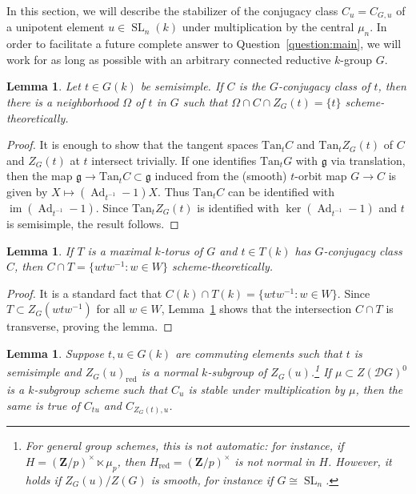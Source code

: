 \documentclass[11pt,reqno]{amsart}
\newtheorem{lemma}[theorem]{Lemma}
\theoremstyle{definition}
\renewcommand{\rm}{\mathrm}
\newcommand{\bZ}{{\mathbf Z}}
\newcommand{\sD}{{\mathscr D}}
\newcommand{\fg}{\mathfrak{g}}
\DeclareMathOperator{\Ad}{Ad}
\DeclareMathOperator{\im}{im}
\DeclareMathOperator{\SL}{SL}
\begin{document}
In this section, we will describe the stabilizer of the conjugacy class $C_u = C_{G, u}$ of a unipotent element $u \in \SL_n(k)$ under multiplication by the central $\mu_n$. In order to facilitate a future complete answer to Question~\ref{question:main}, we will work for as long as possible with an arbitrary connected reductive $k$-group $G$.

\begin{lemma}\label{lemma:transverse-orbit-centralizer}
    Let $t \in G(k)$ be semisimple. If $C$ is the $G$-conjugacy class of $t$, then there is a neighborhood $\Omega$ of $t$ in $G$ such that $\Omega \cap C \cap Z_G(t) = \{t\}$ scheme-theoretically.
\end{lemma}

\begin{proof}
    It is enough to show that the tangent spaces $\rm{Tan}_t C$ and $\rm{Tan}_t Z_G(t)$ of $C$ and $Z_G(t)$ at $t$ intersect trivially. If one identifies $\rm{Tan}_t G$ with $\fg$ via translation, then the map $\fg \to \rm{Tan}_t C \subset \fg$ induced from the (smooth) $t$-orbit map $G \to C$ is given by $X \mapsto (\Ad_{t^{-1}} - 1)X$. Thus $\rm{Tan}_t C$ can be identified with $\im(\Ad_{t^{-1}} - 1)$. Since $\rm{Tan}_t Z_G(t)$ is identified with $\ker(\Ad_{t^{-1}} - 1)$ and $t$ is semisimple, the result follows.
\end{proof}

\begin{lemma}\label{lemma:semisimple-conjugacy-class-cap-T}
    If $T$ is a maximal $k$-torus of $G$ and $t \in T(k)$ has $G$-conjugacy class $C$, then $C \cap T = \{wtw^{-1}\colon w \in W\}$ scheme-theoretically.
\end{lemma}

\begin{proof}
    It is a standard fact that $C(k) \cap T(k) = \{wtw^{-1}\colon w \in W\}$. Since $T \subset Z_G(wtw^{-1})$ for all $w \in W$, Lemma~\ref{lemma:transverse-orbit-centralizer} shows that the intersection $C \cap T$ is transverse, proving the lemma.
\end{proof}

\begin{lemma}\label{lemma:stability-passes-to-jordan}
    Suppose $t, u \in G(k)$ are commuting elements such that $t$ is semisimple and $Z_G(u)_{\rm{red}}$ is a normal $k$-subgroup of $Z_G(u)$.\footnote{For general group schemes, this is not automatic: for instance, if $H = (\bZ/p)^\times \ltimes \mu_p$, then $H_{\rm{red}} = (\bZ/p)^\times$ is not normal in $H$. However, it holds if $Z_G(u)/Z(G)$ is smooth, for instance if $G \cong \SL_n$.}
    If $\mu \subset Z(\sD G)^0$ is a $k$-subgroup scheme such that $C_u$ is stable under multiplication by $\mu$, then the same is true of $C_{tu}$ and $C_{Z_G(t), u}$.
\end{lemma}
\end{document}
